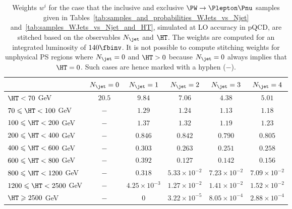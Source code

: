 \begin{table}
\centering
\def\arraystretch{1.3}
\begin{tabular}{l|c|c|c|c|c}
\hline
                                & $N_{\jet} = 0$ & $N_{\jet} = 1$      & $N_{\jet} = 2$      & $N_{\jet} = 3$      & $N_{\jet} = 4$       \\ 
\hline
\hline
               $\HT < 70$   GeV & $20.5$         & $9.84$              & $7.06$              & $4.38$              &  $5.01$              \\
  $70 \leqslant \HT < 100$  GeV & $-$            & $1.29$              & $1.24$              & $1.13$              &  $1.18$              \\
 $100 \leqslant \HT < 200$  GeV & $-$            & $1.37$              & $1.32$              & $1.19$              &  $1.23$              \\
 $200 \leqslant \HT < 400$  GeV & $-$            & $0.846$             & $0.842$             & $0.790$             &  $0.805$             \\
 $400 \leqslant \HT < 600$  GeV & $-$            & $0.303$             & $0.263$             & $0.251$             &  $0.258$             \\
 $600 \leqslant \HT < 800$  GeV & $-$            & $0.392$             & $0.127$             & $0.142$             &  $0.156$             \\
 $800 \leqslant \HT < 1200$ GeV & $-$            & $0.318$             & $5.33\times10^{-2}$ & $7.23\times10^{-2}$ &  $7.09\times10^{-2}$ \\
$1200 \leqslant \HT < 2500$ GeV & $-$            & $4.25\times10^{-3}$ & $1.27\times10^{-2}$ & $1.41\times10^{-2}$ &  $1.52\times10^{-2}$ \\
       $\HT \geqslant 2500$ GeV & $-$            & $0$                 & $3.22\times10^{-5}$ & $8.05\times10^{-4}$ &  $2.88\times10^{-4}$ \\ 
\hline
\end{tabular}
\caption{
  Weights $w^{i}$ for the case that the inclusive and exclusive $\PW \to \Plepton\Pnu$ samples 
  given in Tables~\ref{tab:samples_and_probabilities_WJets_vs_Njet} and~\ref{tab:samples_WJets_vs_Njet_and_HT}, simulated at LO accuracy in pQCD,
  are stitched based on the observables $N_{\jet}$ and $\HT$.
  The weights are computed for an integrated luminosity of $140\fbinv$.
  It is not possible to compute stitching weights for unphysical PS regions where $N_{\jet} = 0$ and $\HT > 0$ because $N_{\jet} = 0$ always implies that $\HT = 0$.
  Such cases are hence marked with a hyphen ($-$).
}
\label{tab:weights_WJets_vs_Njet_and_HT}
\end{table}

